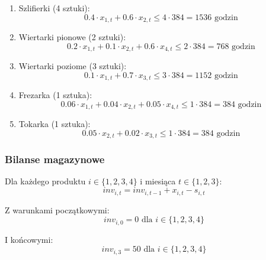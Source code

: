 \documentclass[12pt]{article}
\begin{document}
\begin{enumerate}
  \item Szlifierki (4 sztuki):
  \begin{equation}
  0.4 \cdot x_{1,t} + 0.6 \cdot x_{2,t} \leq 4 \cdot 384 = 1536 \text{ godzin}
  \end{equation}

  \item Wiertarki pionowe (2 sztuki):
  \begin{equation}
  0.2 \cdot x_{1,t} + 0.1 \cdot x_{2,t} + 0.6 \cdot x_{4,t} \leq 2 \cdot 384 = 768 \text{ godzin}
  \end{equation}

  \item Wiertarki poziome (3 sztuki):
  \begin{equation}
  0.1 \cdot x_{1,t} + 0.7 \cdot x_{3,t} \leq 3 \cdot 384 = 1152 \text{ godzin}
  \end{equation}

  \item Frezarka (1 sztuka):
  \begin{equation}
  0.06 \cdot x_{1,t} + 0.04 \cdot x_{2,t} + 0.05 \cdot x_{4,t} \leq 1 \cdot 384 = 384 \text{ godzin}
  \end{equation}

  \item Tokarka (1 sztuka):
  \begin{equation}
  0.05 \cdot x_{2,t} + 0.02 \cdot x_{3,t} \leq 1 \cdot 384 = 384 \text{ godzin}
  \end{equation}
\end{enumerate}

\subsubsection{Bilanse magazynowe}

Dla każdego produktu $i \in \{1,2,3,4\}$ i miesiąca $t \in \{1,2,3\}$:
\begin{equation}
inv_{i,t} = inv_{i,t-1} + x_{i,t} - s_{i,t}
\end{equation}

Z warunkami początkowymi:
\begin{equation}
inv_{i,0} = 0 \text{ dla } i \in \{1,2,3,4\}
\end{equation}

I końcowymi:
\begin{equation}
inv_{i,3} = 50 \text{ dla } i \in \{1,2,3,4\}
\end{equation}
\end{document}
